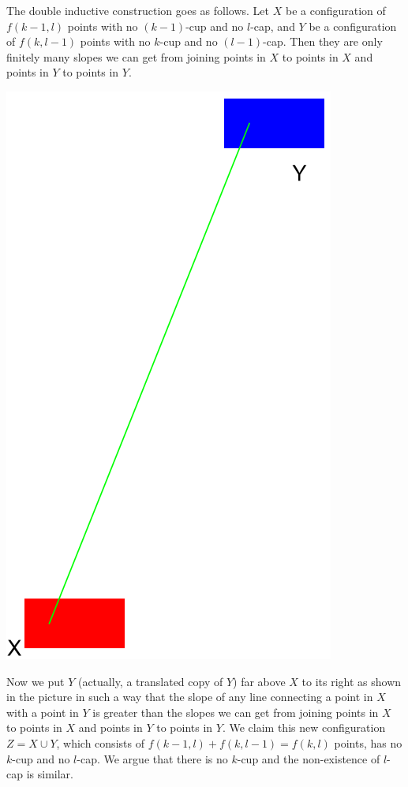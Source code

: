 \documentclass[12pt,reqno]{amsart}
\theoremstyle{definition}
\begin{document}
The double inductive construction goes as follows. Let $X$ be a configuration of $f(k-1,l)$ points with no $(k-1)$-cup and no $l$-cap, and $Y$ be a configuration of $f(k,l-1)$ points with no $k$-cup and no $(l-1)$-cap. Then they are only finitely many slopes we can get from joining points in $X$ to points in $X$ and points in $Y$ to points in $Y$.
\begin{center}
  \includegraphics[scale=0.4]{no_cup_cap.png}
\end{center}
Now we put $Y$ (actually, a translated copy of $Y$) far above $X$ to its right as shown in the picture in such a way that the slope of any line connecting a point in $X$ with a point in $Y$ is greater than the slopes we can get from joining points in $X$ to points in $X$ and points in $Y$ to points in $Y$. We claim this new configuration $Z=X\cup Y$, which consists of $f(k-1,l)+f(k,l-1)=f(k,l)$ points, has no $k$-cup and no $l$-cap. We argue that there is no $k$-cup and the non-existence of $l$-cap is similar.
\end{document}
